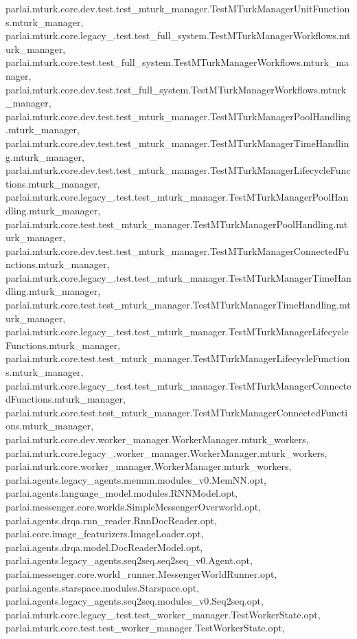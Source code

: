 parlai.\+mturk.\+core.\+dev.\+test.\+test\+\_\+mturk\+\_\+manager.\+Test\+M\+Turk\+Manager\+Unit\+Functions.\+mturk\+\_\+manager, parlai.\+mturk.\+core.\+legacy\+\_.\+test.\+test\+\_\+full\+\_\+system.\+Test\+M\+Turk\+Manager\+Workflows.\+mturk\+\_\+manager, parlai.\+mturk.\+core.\+test.\+test\+\_\+full\+\_\+system.\+Test\+M\+Turk\+Manager\+Workflows.\+mturk\+\_\+manager, parlai.\+mturk.\+core.\+dev.\+test.\+test\+\_\+full\+\_\+system.\+Test\+M\+Turk\+Manager\+Workflows.\+mturk\+\_\+manager, parlai.\+mturk.\+core.\+dev.\+test.\+test\+\_\+mturk\+\_\+manager.\+Test\+M\+Turk\+Manager\+Pool\+Handling.\+mturk\+\_\+manager, parlai.\+mturk.\+core.\+dev.\+test.\+test\+\_\+mturk\+\_\+manager.\+Test\+M\+Turk\+Manager\+Time\+Handling.\+mturk\+\_\+manager, parlai.\+mturk.\+core.\+dev.\+test.\+test\+\_\+mturk\+\_\+manager.\+Test\+M\+Turk\+Manager\+Lifecycle\+Functions.\+mturk\+\_\+manager, parlai.\+mturk.\+core.\+legacy\+\_.\+test.\+test\+\_\+mturk\+\_\+manager.\+Test\+M\+Turk\+Manager\+Pool\+Handling.\+mturk\+\_\+manager, parlai.\+mturk.\+core.\+test.\+test\+\_\+mturk\+\_\+manager.\+Test\+M\+Turk\+Manager\+Pool\+Handling.\+mturk\+\_\+manager, parlai.\+mturk.\+core.\+dev.\+test.\+test\+\_\+mturk\+\_\+manager.\+Test\+M\+Turk\+Manager\+Connected\+Functions.\+mturk\+\_\+manager, parlai.\+mturk.\+core.\+legacy\+\_.\+test.\+test\+\_\+mturk\+\_\+manager.\+Test\+M\+Turk\+Manager\+Time\+Handling.\+mturk\+\_\+manager, parlai.\+mturk.\+core.\+test.\+test\+\_\+mturk\+\_\+manager.\+Test\+M\+Turk\+Manager\+Time\+Handling.\+mturk\+\_\+manager, parlai.\+mturk.\+core.\+legacy\+\_.\+test.\+test\+\_\+mturk\+\_\+manager.\+Test\+M\+Turk\+Manager\+Lifecycle\+Functions.\+mturk\+\_\+manager, parlai.\+mturk.\+core.\+test.\+test\+\_\+mturk\+\_\+manager.\+Test\+M\+Turk\+Manager\+Lifecycle\+Functions.\+mturk\+\_\+manager, parlai.\+mturk.\+core.\+legacy\+\_.\+test.\+test\+\_\+mturk\+\_\+manager.\+Test\+M\+Turk\+Manager\+Connected\+Functions.\+mturk\+\_\+manager, parlai.\+mturk.\+core.\+test.\+test\+\_\+mturk\+\_\+manager.\+Test\+M\+Turk\+Manager\+Connected\+Functions.\+mturk\+\_\+manager, parlai.\+mturk.\+core.\+dev.\+worker\+\_\+manager.\+Worker\+Manager.\+mturk\+\_\+workers, parlai.\+mturk.\+core.\+legacy\+\_.\+worker\+\_\+manager.\+Worker\+Manager.\+mturk\+\_\+workers, parlai.\+mturk.\+core.\+worker\+\_\+manager.\+Worker\+Manager.\+mturk\+\_\+workers, parlai.\+agents.\+legacy\+\_\+agents.\+memnn.\+modules\+\_\+v0.\+Mem\+N\+N.\+opt, parlai.\+agents.\+language\+\_\+model.\+modules.\+R\+N\+N\+Model.\+opt, parlai.\+messenger.\+core.\+worlds.\+Simple\+Messenger\+Overworld.\+opt, parlai.\+agents.\+drqa.\+rnn\+\_\+reader.\+Rnn\+Doc\+Reader.\+opt, parlai.\+core.\+image\+\_\+featurizers.\+Image\+Loader.\+opt, parlai.\+agents.\+drqa.\+model.\+Doc\+Reader\+Model.\+opt, parlai.\+agents.\+legacy\+\_\+agents.\+seq2seq.\+seq2seq\+\_\+v0.\+Agent.\+opt, parlai.\+messenger.\+core.\+world\+\_\+runner.\+Messenger\+World\+Runner.\+opt, parlai.\+agents.\+starspace.\+modules.\+Starspace.\+opt, parlai.\+agents.\+legacy\+\_\+agents.\+seq2seq.\+modules\+\_\+v0.\+Seq2seq.\+opt, parlai.\+mturk.\+core.\+legacy\+\_.\+test.\+test\+\_\+worker\+\_\+manager.\+Test\+Worker\+State.\+opt, parlai.\+mturk.\+core.\+test.\+test\+\_\+worker\+\_\+manager.\+Test\+Worker\+State.\+opt, 